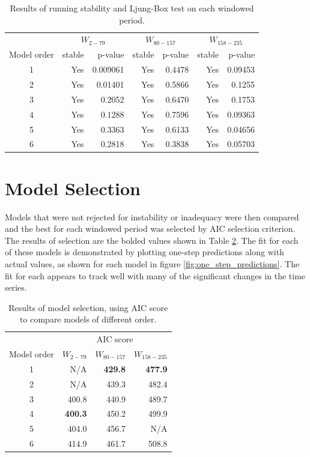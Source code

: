 \documentclass[letterpaper]{report}
\begin{document}
\begin{table}[htbp]
  \centering
  \begin{tabular}{ c | r r | r r | r r }
      & \multicolumn{2}{|c|}{$W_{2-79}$} & \multicolumn{2}{|c|}{$W_{80-157}$} & \multicolumn{2}{|c}{$W_{158-235}$} \\
    Model order & stable & p-value & stable & p-value & stable & p-value \\
    \hline
    1 & Yes & 0.009061 & Yes & 0.4478 & Yes & 0.09453 \\
    2 & Yes & 0.01401 & Yes & 0.5866 & Yes & 0.1255 \\
    3 & Yes & 0.2052 & Yes & 0.6470 & Yes & 0.1753 \\
    4 & Yes & 0.1288 & Yes & 0.7596 & Yes & 0.09363 \\ 
    5 & Yes & 0.3363 & Yes & 0.6133 & Yes & 0.04656 \\
    6 & Yes & 0.2818 & Yes & 0.3838 & Yes & 0.05703 \\
    \hline
  \end{tabular}
\caption[Diagnostic test results]{Results of running stability and Ljung-Box test on each windowed period.}
\label{tab:diagnostic_results}
\end{table}

\section*{Model Selection}
Models that were not rejected for instability or inadequacy were then compared and the best for each windowed period was selected by AIC selection criterion. The results of selection are the bolded values shown in Table \ref{tab:selection_results}. The fit for each of these models is demonstrated by plotting one-step predictions along with actual values, as shown for each model in figure \ref{fig:one_step_predictions}. The fit for each appears to track well with many of the significant changes in the time series.

\begin{table}[htbp]
  \centering
  \begin{tabular}{ c | r | r | r }
    ~ & \multicolumn{3}{|c}{AIC score} \\
    Model order & $W_{2-79}$ & $W_{80-157}$ & $W_{158-235}$ \\
    \hline
    1 & N/A & \textbf{429.8} & \textbf{477.9} \\
    2 & N/A & 439.3 & 482.4 \\
    3 & 400.8 & 440.9 & 489.7 \\
    4 & \textbf{400.3} & 450.2 & 499.9 \\ 
    5 & 404.0 & 456.7 & N/A \\
    6 & 414.9 & 461.7 & 508.8 \\
    \hline
  \end{tabular}
\caption[Model selection results]{Results of model selection, using AIC score to compare models of different order.}
\label{tab:selection_results}
\end{table}
\end{document}

